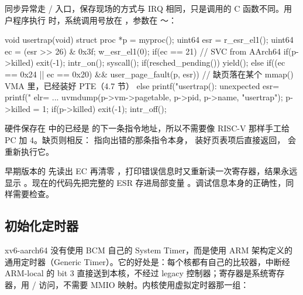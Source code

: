 同步异常走 / 入口，保存现场的方式与 IRQ 相同，只是调用的 C 函数不同。用户程序执行  时，系统调用号放在 ，参数在 ～：


\begin{ccode}
void usertrap(void)
{
  struct proc *p = myproc();
  uint64 esr = r_esr_el1();
  uint64 ec = (esr >> 26) & 0x3f;
  w_esr_el1(0);
  if(ec == 21){                         // SVC from AArch64
    if(p->killed) exit(-1);
    intr_on();
    syscall();
    if(resched_pending()) yield();
  } else if((ec == 0x24 || ec == 0x20) && user_page_fault(p, esr)){
    // 缺页落在某个 mmap() VMA 里，已经装好 PTE（4.7 节）
  } else {
    printf("usertrap(): unexpected esr=%
    printf("            elr=%
    ...
    uvmdump(p->vm->pagetable, p->pid, p->name, "usertrap");
    p->killed = 1;
  }
  if(p->killed) exit(-1);
  intr_off();
}
\end{ccode}

硬件保存在  中的已经是  的下一条指令地址，所以不需要像 RISC-V 那样手工给 PC 加 4。缺页则相反： 指向出错的那条指令本身， 装好页表项后直接返回， 会重新执行它。

\begin{note}
  早期版本的  先读出 EC 再清零 ，打印错误信息时又重新读一次寄存器，结果永远显示 。现在的代码先把完整的 ESR 存进局部变量 。调试信息本身的正确性，同样需要检查。
\end{note}

\subsection{初始化定时器}

xv6-aarch64 没有使用 BCM 自己的 System Timer，而是使用 ARM 架构定义的通用定时器（Generic Timer）。它的好处是：每个核都有自己的比较器，中断经 ARM-local 的 bit 3 直接送到本核，不经过 legacy 控制器；寄存器是系统寄存器，用 / 访问，不需要 MMIO 映射。内核使用虚拟定时器那一组：


